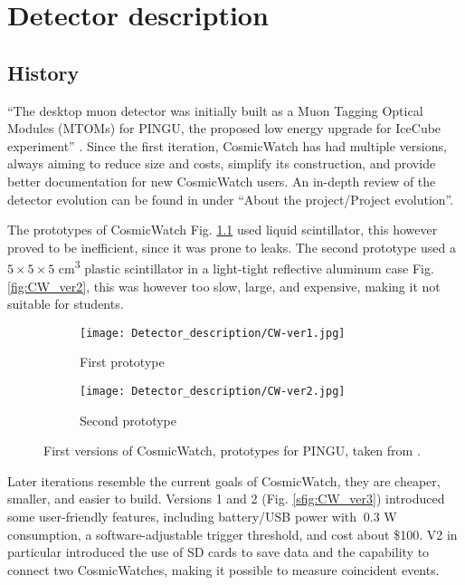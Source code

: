 \chapter{Detector description}

\section{History}

``The desktop muon detector was initially built as a Muon Tagging Optical Modules (MTOMs) for PINGU, the proposed low energy upgrade for IceCube experiment'' \cite{CosmicWatch}. Since the first iteration, CosmicWatch has had multiple versions, always aiming to reduce size and costs, simplify its construction, and provide better documentation for new CosmicWatch users. An in-depth review of the detector evolution can be found in \cite{CosmicWatch} under ``About the project/Project evolution''.

The prototypes of CosmicWatch Fig. \ref{sfig:CW_ver1} used liquid scintillator, this however proved to be inefficient, since it was prone to leaks. The second prototype used a $5\times5\times5$ \unit{\cm\cubed} plastic scintillator in a light-tight reflective aluminum case Fig. \ref{fig:CW_ver2}, this was however too slow, large, and expensive, making it not suitable for students.

\begin{figure}[H]
  \centering
  \begin{subfigure}[t]{0.45\textwidth}
    \texttt{[image: Detector\_description/CW-ver1.jpg]}
    \caption{\label{sfig:CW_ver1} First prototype}
  \end{subfigure}
  \begin{subfigure}[t]{0.45\textwidth}
    \texttt{[image: Detector\_description/CW-ver2.jpg]}
    \caption{\label{sfig:CW_ver2} Second prototype}
  \end{subfigure}
  \caption{\label{fig:CW_ver1_ver2}First versions of CosmicWatch, prototypes for PINGU, taken from \cite{CosmicWatch}.}
\end{figure}

Later iterations resemble the current goals of CosmicWatch, they are cheaper, smaller, and easier to build. Versions 1 and 2 (Fig. \ref{sfig:CW_ver3}) introduced some user-friendly features, including battery/USB power with $~0.3$ \unit{\watt} consumption, a software-adjustable trigger threshold, and cost about \$100. V2 in particular introduced the use of SD cards to save data and the capability to connect two CosmicWatches, making it possible to measure coincident events.

